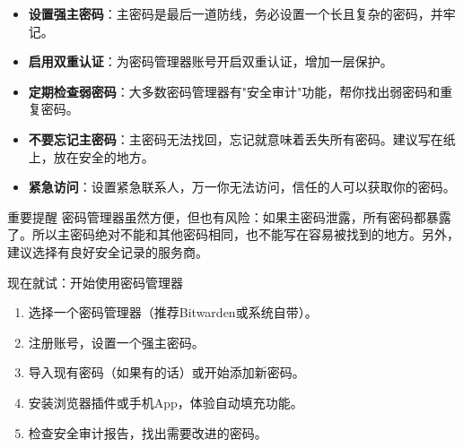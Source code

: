 
\begin{itemize}
  \item \textbf{设置强主密码}：主密码是最后一道防线，务必设置一个长且复杂的密码，并牢记。
  \item \textbf{启用双重认证}：为密码管理器账号开启双重认证，增加一层保护。
  \item \textbf{定期检查弱密码}：大多数密码管理器有"安全审计"功能，帮你找出弱密码和重复密码。
  \item \textbf{不要忘记主密码}：主密码无法找回，忘记就意味着丢失所有密码。建议写在纸上，放在安全的地方。
  \item \textbf{紧急访问}：设置紧急联系人，万一你无法访问，信任的人可以获取你的密码。
\end{itemize}

\begin{tcbwarn}{重要提醒}
密码管理器虽然方便，但也有风险：如果主密码泄露，所有密码都暴露了。所以主密码绝对不能和其他密码相同，也不能写在容易被找到的地方。另外，建议选择有良好安全记录的服务商。

\end{tcbwarn}

\begin{tcbpractice}{现在就试：开始使用密码管理器}
\begin{enumerate}
  \item 选择一个密码管理器（推荐Bitwarden或系统自带）。
  \item 注册账号，设置一个强主密码。
  \item 导入现有密码（如果有的话）或开始添加新密码。
  \item 安装浏览器插件或手机App，体验自动填充功能。
  \item 检查安全审计报告，找出需要改进的密码。
\end{enumerate}

\end{tcbpractice}
